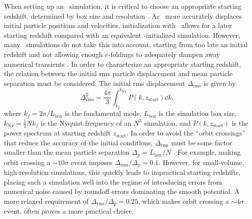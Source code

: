 When setting up an \nbody\ simulation, it is critical to choose an appropriate starting redshift, determined by box size and resolution \citep{2007ApJ...671.1160L}.  As \lpt\ more accurately displaces initial particle positions and velocities, initialization with \lpt\ allows for a later starting redshift compared with an equivalent \za-initialized simulation.  However, many \za\ simulations do not take this into account, starting from too late an initial redshift and not allowing enough $e$-foldings to adequately dampen away numerical transients \citep{2006MNRAS.373..369C, 2010MNRAS.403.1859J}.  In order to characterize an appropriate starting redshift, the relation between the initial rms particle displacement and mean particle separation must be considered.  The initial rms displacement $\Delta_{\mathrm{rms}}$ is given by
\begin{equation}
	\Delta_{\mathrm{rms}}^{2} = \frac{4 \pi}{3} \int_{k_{f}}^{k_{\mathrm{Ny}}} P(k, z_{\mathrm{start}}) \dd k,
\end{equation}
where $k_{f} = 2 \pi / L_{\mathrm{box}}$ is the fundamental mode, $L_{\mathrm{box}}$ is the simulation box size, $k_{\mathrm{Ny}} = \frac{1}{2} N k_{f}$ is the Nyquist frequency of an $N^{3}$ simulation, and $P(k, z_{\mathrm{start}})$ is the power spectrum at starting redshift $z_{\mathrm{start}}$.  In order to avoid the ``orbit crossings'' that reduce the accuracy of the initial conditions, $\Delta_{\mathrm{rms}}$ must be some factor smaller than the mean particle separation $\Delta_{p} = L_{\mathrm{box}} / N$ \citep{2012ApJ...761L...8H}.  For example, making orbit crossing a $\sim 10 \sigma$ event imposes $\Delta_{\mathrm{rms}} / \Delta_{p} = 0.1$.  However, for small-volume, high-resolution simulations, this quickly leads to impractical starting redshifts, placing such a simulation well into the regime of introducing errors from numerical noise caused by roundoff errors dominating the smooth potential.  A more relaxed requirement of $\Delta_{\mathrm{rms}} / \Delta_{p} = 0.25$, which makes orbit crossing a $\sim 4\sigma$ event, often proves a more practical choice.




